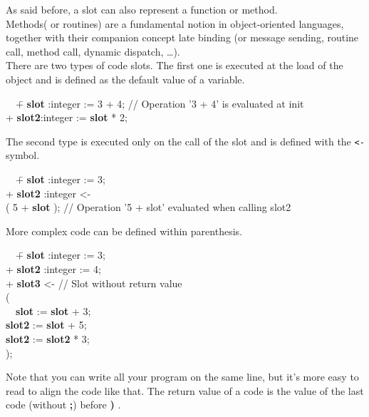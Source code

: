 \documentclass[11pt]{mybook}
\newcommand{\en}[1]
{
  \if \englishversion 1
  #1
  \fi
}
\begin{document}
\en {
	As said before, a slot can also represent a function or method.\\
	Methods( or routines) are a fundamental notion in object-oriented languages, 
        together with their companion concept late binding (or message sending, 
        routine call, method call, dynamic dispatch, \ldots).\\

	There are two types of code slots. The first one is executed at the load of the object and
	is defined as the default value of a variable.

{\tt\begin{tabbing}
~~\= + {\bf{}slot} :{\sc{}integer}  := 3 + 4;      // Operation '3 + 4' is evaluated at init\\
  \> + {\bf{}slot2}:{\sc{}integer}  := {\bf{}slot} * 2;\\
\end{tabbing}}

	The second type is executed only on the call of the slot and is defined with the {\tt <-} symbol.

{\tt\begin{tabbing}
~~\= + {\bf{}slot}  :{\sc{}integer}  := 3;\\
  \> + {\bf{}slot2} :{\sc{}integer}  <- \\
  \> ( 5 + {\bf{}slot} );   // Operation '5 + slot' evaluated when calling slot2
\end{tabbing}}

	More complex code can be defined within parenthesis.

{\tt\begin{tabbing}
~~\= + {\bf{}slot}  :{\sc{}integer}  := 3;\\
  \> + {\bf{}slot2} :{\sc{}integer}  := 4; \\
  \> + {\bf{}slot3}  <-     // Slot without return value\\
  \> (\\
  \>~~\= {\bf{}slot}  := {\bf{}slot} + 3;\\
  \>  \> {\bf{}slot2} := {\bf{}slot} + 5;\\
  \>  \> {\bf{}slot2} := {\bf{}slot2} * 3;\\
  \> );
\end{tabbing}}

	Note that you can write all your program on the same line, but it's more easy to read to align the code like that.
	The return value of a code is the value of the last code (without {\bf{} ;}) before {\bf{} )} .

}
\end{document}
